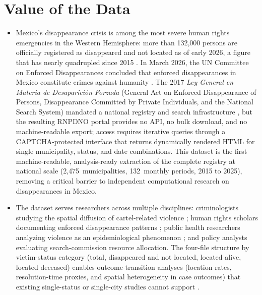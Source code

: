 \documentclass[3p]{elsarticle}
\begin{document}

\section*{Value of the Data}
\begin{itemize}

  \item Mexico's disappearance crisis is among the most severe
    human rights emergencies in the Western Hemisphere:
    more than 132{,}000 persons are officially registered as
    disappeared and not located as of early 2026, a figure that
    has nearly quadrupled since 2015
    \cite{mandolessi_2022, cnb_rnpdno}.
    In March 2026, the UN Committee on Enforced Disappearances
    concluded that enforced disappearances in Mexico constitute
    crimes against humanity \cite{CED_MEX_art34_2026}.
    The 2017 \emph{Ley General en Materia de Desaparici\'{o}n
Forzada} (General Act on Enforced Disappearance of Persons,
Disappearance Committed by Private Individuals, and the
National Search System) mandated a national registry and
search infrastructure \cite{ley_general_2017}, but the resulting
    RNPDNO portal provides no API, no bulk download, and no
    machine-readable export; access requires iterative queries
    through a CAPTCHA-protected interface that returns dynamically
    rendered HTML for single municipality, status, and date
    combinations.
    This dataset is the first machine-readable, analysis-ready
    extraction of the complete registry at national scale
    (2{,}475~municipalities, 132~monthly periods, 2015 to 2025),
    removing a critical barrier to independent computational
    research on disappearances in Mexico.

  \item The dataset serves researchers across multiple
    disciplines: criminologists studying the spatial diffusion
    of cartel-related violence \cite{atuesta_2024};
    human rights scholars documenting enforced disappearance
    patterns \cite{mandolessi_2022};
    public health researchers analyzing violence as an
    epidemiological phenomenon \cite{das_2025};
    and policy analysts evaluating search-commission resource
    allocation.
    The four-file structure by victim-status category
    (total, disappeared and not located, located alive,
    located deceased) enables outcome-transition analyses
    (location rates, resolution-time proxies, and spatial
    heterogeneity in case outcomes) that existing single-status
    or single-city studies cannot support
    \cite{aguilar_velazquez_2025}.


\end{itemize}
\end{document}
